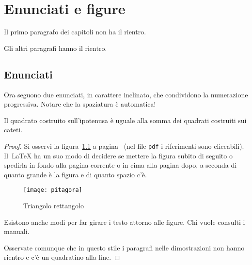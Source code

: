 


\chapter{Enunciati e figure}
  
Il primo paragrafo dei capitoli non ha il rientro.

Gli altri paragrafi hanno il rientro.

\section{Enunciati}

Ora seguono due enunciati, in carattere inclinato, che condividono la numerazione progressiva. Notare che la spaziatura è automatica!

\begin{teorema}
Il quadrato costruito sull'ipotenusa è uguale alla somma dei quadrati costruiti sui cateti.
\end{teorema}

\begin{proof}
Si osservi la figura~\ref{figura:pitagora} a pagina~\pageref{figura:pitagora} (nel file \texttt{pdf} i riferimenti sono cliccabili). Il~\LaTeX{} ha un suo modo di decidere se mettere la figura subito di seguito o spedirla in fondo alla pagina corrente o in cima alla pagina dopo, a seconda di quanto grande è la figura e di quanto spazio c'è.

\begin{figure}
\begin{center}
\texttt{[image: pitagora]}
\caption[teor. di Pitagora]{Triangolo rettangolo}
\label{figura:pitagora}
\end{center}
\end{figure}

Esistono anche modi per far girare i testo attorno alle
figure. Chi vuole consulti i manuali.

Osservate comunque che in questo stile i paragrafi nelle dimostrazioni non hanno rientro e c'è un quadratino alla fine.
\end{proof}

